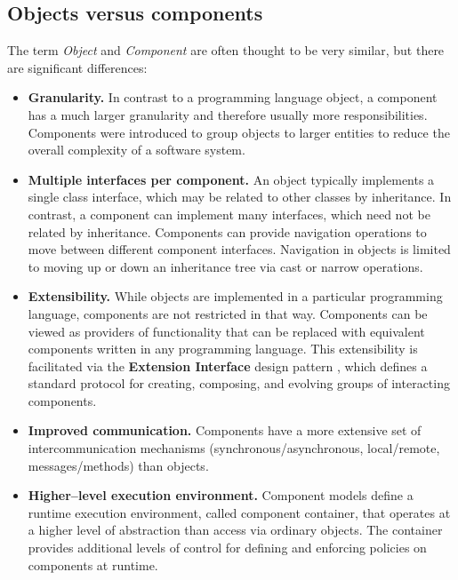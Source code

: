 \subsection{Objects versus components}
The term {\it Object} and {\it Component} are often thought to be very similar,
but there are significant differences:
\begin{itemize}
\item {\bf Granularity.}
In contrast to a programming language object, a component has a much larger 
granularity and therefore usually more responsibilities.
Components were introduced to group objects to larger entities to reduce the
overall complexity of a software system. 

\item {\bf Multiple interfaces per component.}
An object typically implements a single class interface, which may be related
to other classes by inheritance.
In contrast, a component can implement many interfaces, which need not be 
related by inheritance.
Components can provide navigation operations to move between different 
component interfaces.
Navigation in objects is limited to moving up or down an inheritance tree
via cast or narrow operations.

\item {\bf Extensibility.}
While objects are implemented in a particular programming language,
components are not restricted in that way.
Components can be viewed as providers of functionality that can be 
replaced with equivalent components written in any programming language.
This extensibility is facilitated via the {\bf Extension Interface} design
pattern \cite{POSA2}, which defines a standard protocol for creating,
composing, and evolving groups of interacting components.

\item {\bf Improved communication.}
Components have a more extensive set of intercommunication mechanisms 
(synchronous/asynchronous, local/remote, messages/methods) 
than objects. 

\item {\bf Higher--level execution environment.}
Component models define a runtime execution environment, called component 
container, that operates at a higher level of abstraction than access via
ordinary objects.
The container provides additional levels of control for defining and
enforcing policies on components at runtime. 
\end{itemize}



